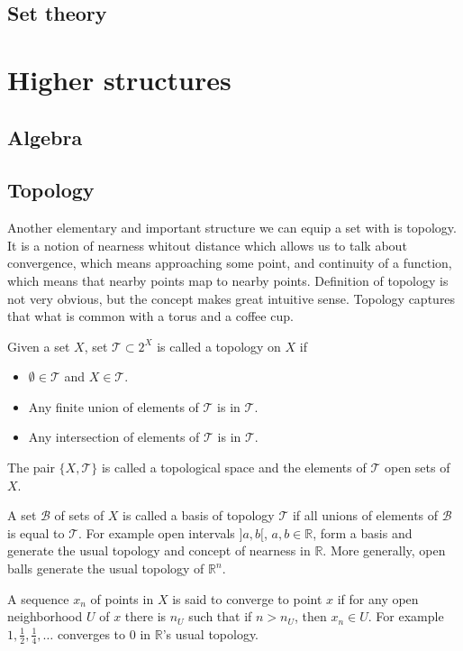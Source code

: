 \documentclass[11pt,oneside,%
]{memoir}
\theoremstyle{definition}
\newcommand{\RR}{\mathbb{R}}
\begin{document}
\section{Set theory}

\chapter{Higher structures}

\section{Algebra}

\section{Topology}

Another elementary and important structure we can equip a set with is topology. It is a notion of nearness whitout distance which allows us to talk about convergence, which means approaching some point, and continuity of a function, which means that nearby points map to nearby points. Definition of topology is not very obvious, but the concept makes great intuitive sense. Topology captures that what is common with a torus and a coffee cup.

Given a set \(X\), set \(\mathcal{T}\subset2^X\) is called a topology on \(X\) if
\begin{itemize}
    \item \(\emptyset\in\mathcal{T}\) and \(X\in\mathcal{T}\).
    \item Any finite union of elements of \(\mathcal{T}\) is in \(\mathcal{T}\).
    \item Any intersection of elements of \(\mathcal{T}\) is in \(\mathcal{T}\).
\end{itemize}
The pair \(\lbrace X,\mathcal{T}\rbrace\) is called a topological space and the elements of \(\mathcal{T}\) open sets of \(X\).

A set \(\mathcal{B}\) of sets of \(X\) is called a basis of topology \(\mathcal{T}\) if all unions of elements of \(\mathcal{B}\) is equal to \(\mathcal{T}\). For example open intervals \(]a,b[\), \(a,b\in\RR\), form a basis and generate the usual topology and concept of nearness in \(\RR\). More generally, open balls generate the usual topology of \(\RR^n\).

A sequence \(x_n\) of points in \(X\) is said to converge to point \(x\) if for any open neighborhood \(U\) of \(x\) there is \(n_U\) such that if \(n>n_U\), then \(x_n\in U\). For example \(1,\frac{1}{2},\frac{1}{4},\dotsc\) converges to \(0\) in \(\RR\)'s usual topology.
\end{document}
